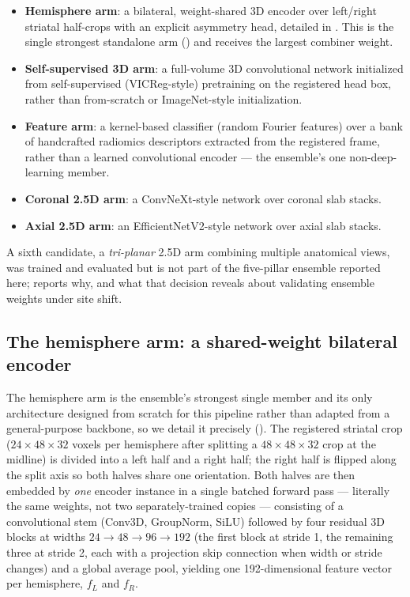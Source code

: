 \documentclass[11pt]{article}
\begin{document}
\begin{itemize}[leftmargin=*]
\item \textbf{Hemisphere arm}: a bilateral, weight-shared 3D encoder over left/right striatal half-crops with an explicit asymmetry head, detailed in . This is the single strongest standalone arm () and receives the largest combiner weight.
\item \textbf{Self-supervised 3D arm}: a full-volume 3D convolutional network initialized from self-supervised (VICReg-style) pretraining on the registered head box, rather than from-scratch or ImageNet-style initialization.
\item \textbf{Feature arm}: a kernel-based classifier (random Fourier features) over a bank of handcrafted radiomics descriptors extracted from the registered frame, rather than a learned convolutional encoder --- the ensemble's one non-deep-learning member.
\item \textbf{Coronal 2.5D arm}: a ConvNeXt-style network over coronal slab stacks.
\item \textbf{Axial 2.5D arm}: an EfficientNetV2-style network over axial slab stacks.
\end{itemize}

A sixth candidate, a \emph{tri-planar} 2.5D arm combining multiple anatomical views, was trained and evaluated but is not part of the five-pillar ensemble reported here;  reports why, and what that decision reveals about validating ensemble weights under site shift.

\subsection{The hemisphere arm: a shared-weight bilateral encoder}
\label{sec:hemi}

The hemisphere arm is the ensemble's strongest single member and its only architecture designed from scratch for this pipeline rather than adapted from a general-purpose backbone, so we detail it precisely (). The registered striatal crop ($24\times48\times32$ voxels per hemisphere after splitting a $48\times48\times32$ crop at the midline) is divided into a left half and a right half; the right half is flipped along the split axis so both halves share one orientation. Both halves are then embedded by \emph{one} encoder instance in a single batched forward pass --- literally the same weights, not two separately-trained copies --- consisting of a convolutional stem (Conv3D, GroupNorm, SiLU) followed by four residual 3D blocks at widths $24{\to}48{\to}96{\to}192$ (the first block at stride 1, the remaining three at stride 2, each with a projection skip connection when width or stride changes) and a global average pool, yielding one 192-dimensional feature vector per hemisphere, $f_L$ and $f_R$.
\end{document}
